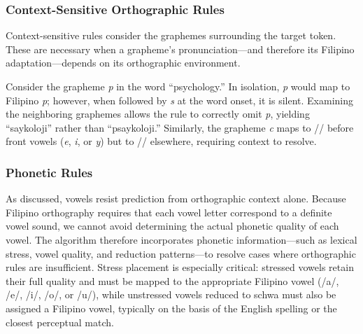 \subsubsection{Context-Sensitive Orthographic Rules}

Context-sensitive rules consider the graphemes surrounding the target token.
These are necessary when a grapheme's pronunciation---and therefore its Filipino
adaptation---depends on its orthographic environment.

Consider the grapheme \emph{p} in the word ``psychology.'' In isolation,
\emph{p} would map to Filipino \emph{p}; however, when followed by \emph{s} at
the word onset, it is silent. Examining the neighboring graphemes allows the
rule to correctly omit \emph{p}, yielding ``saykoloji'' rather than ``psaykoloji.'' Similarly, the grapheme \emph{c} maps to // before
front vowels (\emph{e}, \emph{i}, or \emph{y}) but to // elsewhere, requiring
context to resolve.

\subsubsection{Phonetic Rules}

As discussed, vowels resist prediction from orthographic context alone. Because
Filipino orthography requires that each vowel letter correspond to a definite
vowel sound, we cannot avoid determining the actual phonetic quality of each
vowel. The algorithm therefore incorporates phonetic information---such as
lexical stress, vowel quality, and reduction patterns---to resolve cases where
orthographic rules are insufficient. Stress placement is especially critical:
stressed vowels retain their full quality and must be mapped to the appropriate
Filipino vowel (/a/, /e/, /i/, /o/, or /u/), while unstressed vowels reduced
to schwa must also be assigned a Filipino vowel, typically on the basis of the
English spelling or the closest perceptual match.